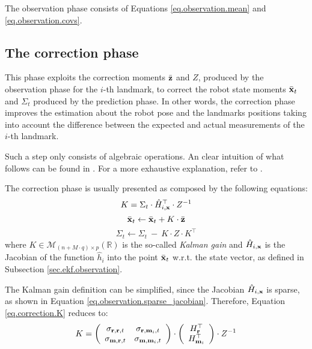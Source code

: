 	\begin{recap}
		The observation phase consists of Equations \ref{eq.observation.mean} and \ref{eq.observation.covs}.
	\end{recap}
	
\subsection{The correction phase}
	This phase exploits the correction moments $\bar{\boldsymbol{\mathrm{{z}}}}$ and $Z$, produced by the observation phase for the $i$-th landmark, to correct the robot state moments $\bar{\boldsymbol{\mathrm{{x}}}}_t$ and $\Sigma_t$ produced by the prediction phase. 
	In other words, the correction phase improves the estimation about the robot pose and the landmarks positions taking into account the difference between the expected and actual measurements of the $i$-th landmark.
	
	Such a step only consists of algebraic operations. 
	An clear intuition of what follows can be found in \cite[Unit C]{brenner204}.
	For a more exhaustive explanation, refer to \cite[Ch. 3]{thrun2005}.
	
	The correction phase is usually presented as composed by the following equations:
	\begin{equation}
		\label{eq.correction.K}
		K = \Sigma_t \cdot \hat{H}^\top_{i,\boldsymbol{\mathrm{{x}}}} \cdot Z^{-1}
	\end{equation}
	\begin{equation}
		\label{eq.correction.x}
		\bar{\boldsymbol{\mathrm{{x}}}}_t \leftarrow \bar{\boldsymbol{\mathrm{{x}}}}_t + K \cdot \bar{\boldsymbol{\mathrm{{z}}}}
	\end{equation}
	\begin{equation}
		\label{eq.correction.Sigma}
		\Sigma_t \leftarrow \Sigma_t \ - \ K \cdot Z \cdot K^\top
	\end{equation}
	where $K \in \mathcal{M}_{(n + M \cdot q) \times p}(\mathbb{R})$ is the so-called \emph{Kalman gain} and $\hat{H}_{i,\boldsymbol{\mathrm{{x}}}}$ is the Jacobian of the function $\hat{h}_i$ into the point $\bar{\boldsymbol{\mathrm{{x}}}}_t$ w.r.t. the state vector, as defined in Subsection \ref{sec.ekf.observation}.
	
	The Kalman gain definition can be simplified, since the Jacobian $\hat{H}_{i,\boldsymbol{\mathrm{{x}}}}$ is sparse, as shown in Equation \ref{eq.observation.sparse_jacobian}.
	Therefore, Equation \ref{eq.correction.K} reduces to:
	\begin{equation}
		\label{eq.correction.kalman_gain}
		K = 
		\left(\begin{array}{cc}
			\sigma_{\boldsymbol{\mathrm{{r}}}, \boldsymbol{\mathrm{{r}}}, t} & \sigma_{\boldsymbol{\mathrm{{r}}}, \boldsymbol{\mathrm{{m}}}_i, t} \\
			\sigma_{\boldsymbol{\mathrm{{m}}}, \boldsymbol{\mathrm{{r}}}, t} & \sigma_{\boldsymbol{\mathrm{{m}}}, \boldsymbol{\mathrm{{m}}}_i, t}
		\end{array}\right)
		\cdot
		\left(\begin{array}{c}
			H^\top_{\boldsymbol{\mathrm{{r}}}} \\ H^\top_{\boldsymbol{\mathrm{{m}}}_i}
		\end{array}\right)
		\cdot
		Z^{-1}
	\end{equation}
	
